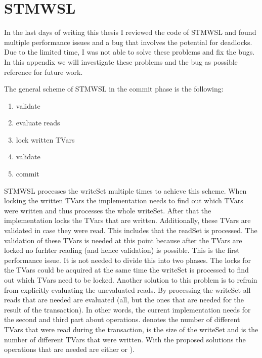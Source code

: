
\chapter{STMWSL} 

\label{AppendixB} 

In the last days of writing this thesis I reviewed the code of STMWSL and found multiple performance
issues and a bug that involves the potential for deadlocks. Due to the limited time, I was not able to 
solve these problems and fix the bugs. In this appendix we will investigate these problems and the 
bug as possible reference for future work. 

The general scheme of STMWSL in the commit phase is the following:
\begin{enumerate}
 \item validate
 \item evaluate reads
 \item lock written TVars
 \item validate
 \item commit
\end{enumerate}
STMWSL processes the writeSet multiple times to achieve this scheme. When locking the written TVars the
implementation needs to find out which TVars were written and thus processes the whole writeSet. After 
that the implementation locks the TVars that are written. Additionally, these TVars are validated in
case they were read. This includes that the readSet is processed.
The validation of these TVars is needed at this point because after the TVars are locked no
furhter reading (and hence validation) is possible. This is the first performance issue.
It is not needed to divide this into two phases. The locks for the TVars could be acquired at the
same time the writeSet is processed to find out which TVars need to be locked. Another solution to
this problem is to refrain from explicitly evaluating the unevaluated reads. By processing the writeSet
all reads that are needed are evaluated (all, but the ones that are needed for the result of the transaction).
In other words, the current implementation needs for the second and third part about 
operations.  denotes the number of different TVars that were read during the transaction, 
is the size of the writeSet and  is the number of different TVars that were written.
With the proposed solutions the operations that are needed are either  or 
). 


